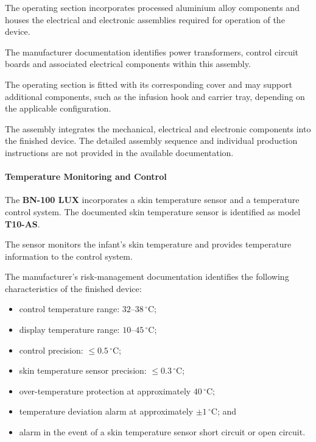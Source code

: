 The operating section incorporates processed aluminium alloy
components and houses the electrical and electronic assemblies
required for operation of the device.

The manufacturer documentation identifies power transformers,
control circuit boards and associated electrical components within
this assembly.

The operating section is fitted with its corresponding cover and
may support additional components, such as the infusion hook and
carrier tray, depending on the applicable configuration.

The assembly integrates the mechanical, electrical and electronic
components into the finished device. The detailed assembly sequence
and individual production instructions are not provided in the
available documentation.


\paragraph{Temperature Monitoring and Control}

The \textbf{BN-100 LUX} incorporates a skin temperature sensor and
a temperature control system. The documented skin temperature
sensor is identified as model \textbf{T10-AS}.

The sensor monitors the infant's skin temperature and provides
temperature information to the control system.

The manufacturer's risk-management documentation identifies the
following characteristics of the finished device:

\begin{itemize}
    \item control temperature range: \(32\text{--}38\,^\circ\mathrm{C}\);
    \item display temperature range: \(10\text{--}45\,^\circ\mathrm{C}\);
    \item control precision: \(\leq 0.5\,^\circ\mathrm{C}\);
    \item skin temperature sensor precision:
    \(\leq 0.3\,^\circ\mathrm{C}\);
    \item over-temperature protection at approximately
    \(40\,^\circ\mathrm{C}\);
    \item temperature deviation alarm at approximately
    \(\pm 1\,^\circ\mathrm{C}\); and
    \item alarm in the event of a skin temperature sensor
    short circuit or open circuit.
\end{itemize}

